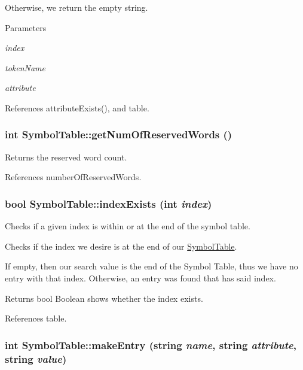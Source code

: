 Otherwise, we return the empty string. 
\begin{DoxyParams}{Parameters}
\item[{\em index}]\item[{\em tokenName}]\item[{\em attribute}]\end{DoxyParams}


References attributeExists(), and table.

\hypertarget{classSymbolTable_a218f832e3d8b4d37cb3aee7af732a0c6}{
\subsubsection[{getNumOfReservedWords}]{\setlength{\rightskip}{0pt plus 5cm}int SymbolTable::getNumOfReservedWords ()}}
\label{classSymbolTable_a218f832e3d8b4d37cb3aee7af732a0c6}


Returns the reserved word count. 



References numberOfReservedWords.

\hypertarget{classSymbolTable_a70c8b5e2a159350ffefffffbf6d974ee}{
\subsubsection[{indexExists}]{\setlength{\rightskip}{0pt plus 5cm}bool SymbolTable::indexExists (int {\em index})}}
\label{classSymbolTable_a70c8b5e2a159350ffefffffbf6d974ee}


Checks if a given index is within or at the end of the symbol table. 

Checks if the index we desire is at the end of our \hyperlink{classSymbolTable}{SymbolTable}.

If empty, then our search value is the end of the Symbol Table, thus we have no entry with that index. Otherwise, an entry was found that has said index. \begin{DoxyReturn}{Returns}
bool Boolean shows whether the index exists. 
\end{DoxyReturn}


References table.

\hypertarget{classSymbolTable_a064e30f7ddbd4065244d1d41ea885737}{
\subsubsection[{makeEntry}]{\setlength{\rightskip}{0pt plus 5cm}int SymbolTable::makeEntry (string {\em name}, \/  string {\em attribute}, \/  string {\em value})}}
\label{classSymbolTable_a064e30f7ddbd4065244d1d41ea885737}


